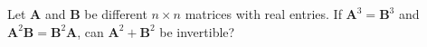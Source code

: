 Let $\mathbf{A}$ and $\mathbf{B}$ be different $n \times n$ matrices with real entries.
If $\mathbf{A}^3 = \mathbf{B}^3$ and $\mathbf{A}^2 \mathbf{B} = \mathbf{B}^2 \mathbf{A}$, can $\mathbf{A}^2 + \mathbf{B}^2$ be invertible?
